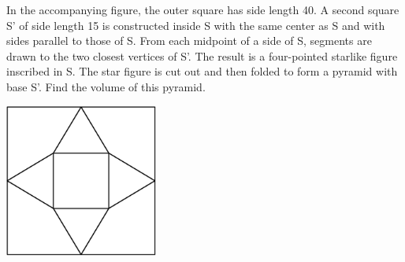 In the accompanying figure, the outer square has side length 40. A second square S' of side length 15 is constructed inside S with the same center as S and with sides parallel to those of S. From each midpoint of a side of S, segments are drawn to the two closest vertices of S'. The result is a four-pointed starlike figure inscribed in S. The star figure is cut out and then folded to form a pyramid with base S'. Find the volume of this pyramid.
\begin{center}
\includegraphics[width = 50.400000000000006mm]{img/fig0.png}
\end{center}